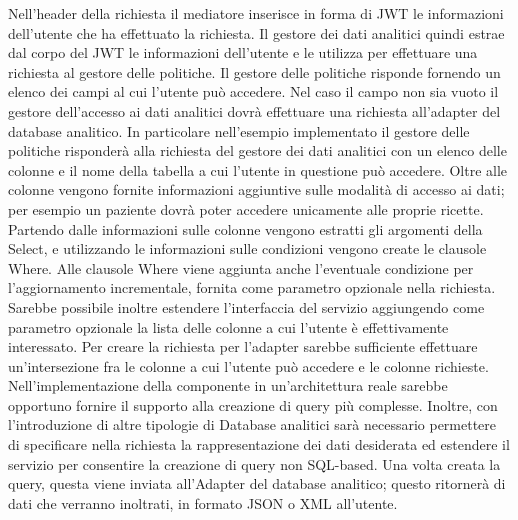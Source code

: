 \documentclass[a4paper,12pt]{report}
\begin{document}
Nell'header della richiesta il mediatore inserisce in forma di JWT le informazioni dell'utente che ha effettuato la richiesta.
Il gestore dei dati analitici quindi estrae dal corpo del JWT le informazioni dell'utente e le utilizza per effettuare una richiesta al gestore delle politiche.
Il gestore delle politiche risponde fornendo un elenco dei campi al cui l'utente può accedere.
Nel caso il campo non sia vuoto il gestore dell'accesso ai dati analitici dovrà effettuare una richiesta all'adapter del database analitico.
In particolare nell'esempio implementato il gestore delle politiche risponderà alla richiesta del gestore dei dati analitici con un elenco delle colonne e il nome della tabella a cui l'utente in questione può accedere.
Oltre alle colonne vengono fornite informazioni aggiuntive sulle modalità di accesso ai dati; per esempio un paziente dovrà poter accedere unicamente alle proprie ricette.
Partendo dalle informazioni sulle colonne vengono estratti gli argomenti della Select, e utilizzando le informazioni sulle condizioni vengono create le clausole Where.
Alle clausole Where viene aggiunta anche l'eventuale condizione per l'aggiornamento incrementale, fornita come parametro opzionale nella richiesta.
Sarebbe possibile inoltre estendere l'interfaccia del servizio aggiungendo come parametro opzionale la lista delle colonne a cui l'utente è effettivamente interessato.
Per creare la richiesta per l'adapter sarebbe sufficiente effettuare un'intersezione fra le colonne a cui l'utente può accedere e le colonne richieste.
Nell'implementazione della componente in un'architettura reale sarebbe opportuno fornire il supporto alla creazione di query più complesse.
Inoltre, con l'introduzione di altre tipologie di Database analitici sarà necessario permettere di specificare nella richiesta la rappresentazione dei dati desiderata ed estendere il servizio per consentire la creazione di query non SQL-based. 
Una volta creata la query, questa viene inviata all'Adapter del database analitico; questo ritornerà di dati che verranno inoltrati, in formato JSON o XML all'utente.
\end{document}
